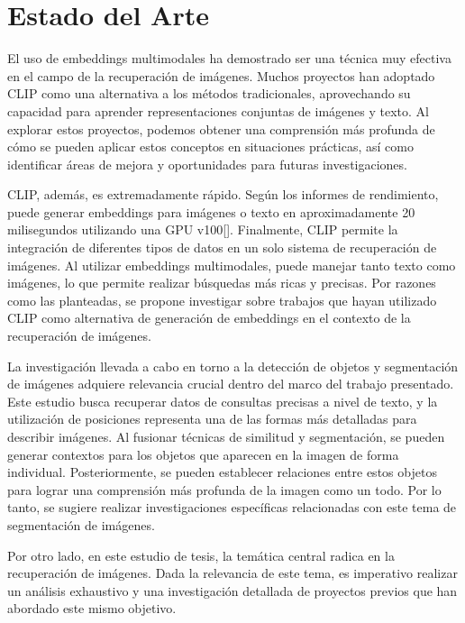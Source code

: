 \chapter{Estado del Arte}\label{chapter:state-of-the-art}

El uso de embeddings multimodales ha demostrado ser una técnica muy efectiva en el campo de la recuperaci\'on de im\'agenes. Muchos proyectos han adoptado CLIP como una alternativa a los métodos tradicionales, aprovechando su capacidad para aprender representaciones conjuntas de imágenes y texto. Al explorar estos proyectos, podemos obtener una comprensión más profunda de cómo se pueden aplicar estos conceptos en situaciones prácticas, así como identificar áreas de mejora y oportunidades para futuras investigaciones.

CLIP, además, es extremadamente rápido. Según los informes de rendimiento, puede generar embeddings para imágenes o texto en aproximadamente 20 milisegundos utilizando una GPU v100[\cite{BuildingImageClip-20ms}]. Finalmente, CLIP permite la integración de diferentes tipos de datos en un solo sistema de recuperación de imágenes. Al utilizar embeddings multimodales, puede manejar tanto texto como imágenes, lo que permite realizar búsquedas más ricas y precisas. Por razones como las planteadas, se propone investigar sobre trabajos que hayan utilizado CLIP como alternativa de generación de embeddings en el contexto de la recuperación de imágenes.

La investigación llevada a cabo en torno a la detección de objetos y segmentación de imágenes adquiere relevancia crucial dentro del marco del trabajo presentado. Este estudio busca recuperar datos de consultas precisas a nivel de texto, y la utilización de posiciones representa una de las formas más detalladas para describir imágenes. Al fusionar técnicas de similitud y segmentación, se pueden generar contextos para los objetos que aparecen en la imagen de forma individual. Posteriormente, se pueden establecer relaciones entre estos objetos para lograr una comprensión más profunda de la imagen como un todo. Por lo tanto, se sugiere realizar investigaciones específicas relacionadas con este tema de segmentación de imágenes.

Por otro lado, en este estudio de tesis, la temática central radica en la recuperación de imágenes. Dada la relevancia de este tema, es imperativo realizar un análisis exhaustivo y una investigación detallada de proyectos previos que han abordado este mismo objetivo.


